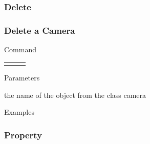 \documentclass[9pt]{beamer}
\begin{document}
\subsubsection{Delete}

\begin{frame}[t] \frametitle{Delete a Camera}

	\begin{block}{Command} 
		\begin{tabularx}{\textwidth}{@{}l@{}l@{}R}
			 &
				 & \InstrItem
		\end{tabularx}
	\end{block}

	\begin{block}{Parameters} \begin{itemize}
		   the name of the object from the class camera
	\end{itemize} \end{block}

	\begin{block}{Examples}
	\end{block}

\end{frame}

\subsubsection{Property}
\end{document}
